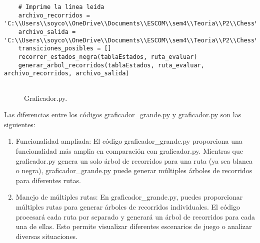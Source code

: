 \begin{enumerate}
\begin{lstlisting}
    # Imprime la línea leída
    archivo_recorridos = 'C:\\Users\\soyco\\OneDrive\\Documents\\ESCOM\\sem4\\Teoria\\P2\\Chess\\output\\recorridos_negra.txt'
    archivo_salida = 'C:\\Users\\soyco\\OneDrive\\Documents\\ESCOM\\sem4\\Teoria\\P2\\Chess\\output\\arbol_negra.dot'
    transiciones_posibles = []
    recorrer_estados_negra(tablaEstados, ruta_evaluar)
    generar_arbol_recorridos(tablaEstados, ruta_evaluar, archivo_recorridos, archivo_salida)
    

\end{lstlisting}
\begin{figure}[h]
\caption{Graficador.py.}
\label{fig:imagen}
\end{figure}

 
 Las diferencias entre los códigos graficador\_grande.py y graficador.py son las siguientes:\newline
\begin{enumerate}
    
    \item Funcionalidad ampliada: El código graficador\_grande.py proporciona una funcionalidad más amplia en comparación con graficador.py. Mientras que graficador.py genera un solo árbol de recorridos para una ruta (ya sea blanca o negra), graficador\_grande.py puede generar múltiples árboles de recorridos para diferentes rutas.\newline

    \item Manejo de múltiples rutas: En graficador\_grande.py, puedes proporcionar múltiples rutas para generar árboles de recorridos individuales. El código procesará cada ruta por separado y generará un árbol de recorridos para cada una de ellas. Esto permite visualizar diferentes escenarios de juego o analizar diversas situaciones.\newline
    

\end{enumerate}
\end{enumerate}
